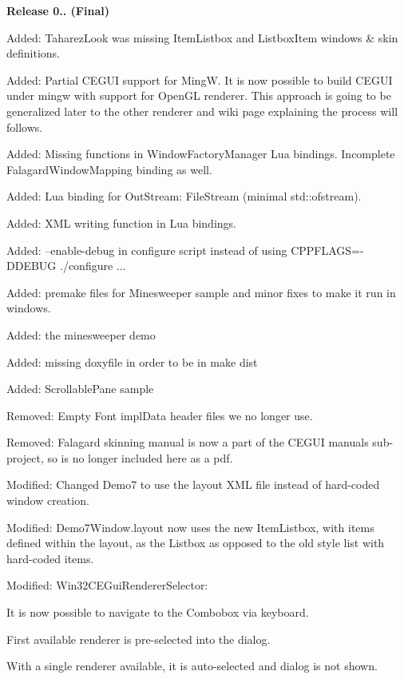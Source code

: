 {\bfseries{Release 0.. (Final)}}
\begin{DoxyItemize}
\item Added\+: Taharez\+Look was missing Item\+Listbox and Listbox\+Item windows \& skin definitions.
\item Added\+: Partial C\+E\+G\+UI support for MingW. It is now possible to build C\+E\+G\+UI under mingw with support for Open\+GL renderer. This approach is going to be generalized later to the other renderer and wiki page explaining the process will follows.
\item Added\+: Missing functions in Window\+Factory\+Manager Lua bindings. Incomplete Falagard\+Window\+Mapping binding as well.
\item Added\+: Lua binding for Out\+Stream\+: File\+Stream (minimal std\+::ofstream).
\item Added\+: X\+ML writing function in Lua bindings.
\item Added\+: --enable-\/debug in configure script instead of using C\+P\+P\+F\+L\+A\+GS=-\/D\+D\+E\+B\+UG ./configure ...
\item Added\+: premake files for Minesweeper sample and minor fixes to make it run in windows.
\item Added\+: the minesweeper demo
\item Added\+: missing doxyfile in order to be in make dist
\item Added\+: Scrollable\+Pane sample
\item Removed\+: Empty Font \textquotesingle{}impl\+Data\textquotesingle{} header files we no longer use.
\item Removed\+: Falagard skinning manual is now a part of the C\+E\+G\+UI manuals sub-\/project, so is no longer included here as a pdf.
\item Modified\+: Changed Demo7 to use the layout X\+ML file instead of hard-\/coded window creation.
\item Modified\+: Demo7\+Window.\+layout now uses the new Item\+Listbox, with items defined within the layout, as the Listbox as opposed to the old style list with hard-\/coded items.
\item Modified\+: Win32\+C\+E\+Gui\+Renderer\+Selector\+:
\begin{DoxyItemize}
\item It is now possible to navigate to the Combobox via keyboard.
\item First available renderer is pre-\/selected into the dialog.
\item With a single renderer available, it is auto-\/selected and dialog is not shown.

\end{DoxyItemize}
\end{DoxyItemize}
